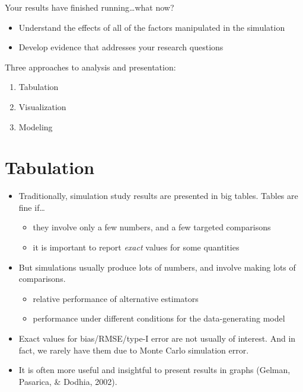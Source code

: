 \documentclass[
]{book}
\providecommand{\tightlist}{%
  \setlength{\itemsep}{0pt}\setlength{\parskip}{0pt}}
\begin{document}
Your results have finished running\ldots what now?

\begin{itemize}
\tightlist
\item
  Understand the effects of all of the factors manipulated in the simulation
\item
  Develop evidence that addresses your research questions
\end{itemize}

Three approaches to analysis and presentation:

\begin{enumerate}
\def\labelenumi{\arabic{enumi}.}
\tightlist
\item
  Tabulation
\item
  Visualization
\item
  Modeling
\end{enumerate}

\hypertarget{tabulation}{%
\section{Tabulation}\label{tabulation}}

\begin{itemize}
\item
  Traditionally, simulation study results are presented in big tables. Tables are fine if\ldots{}

  \begin{itemize}
  \tightlist
  \item
    they involve only a few numbers, and a few targeted comparisons
  \item
    it is important to report \emph{exact} values for some quantities
  \end{itemize}
\item
  But simulations usually produce lots of numbers, and involve making lots of comparisons.

  \begin{itemize}
  \tightlist
  \item
    relative performance of alternative estimators
  \item
    performance under different conditions for the data-generating model
  \end{itemize}
\item
  Exact values for bias/RMSE/type-I error are not usually of interest. And in fact, we rarely have them due to Monte Carlo simulation error.
\item
  It is often more useful and insightful to present results in graphs (Gelman, Pasarica, \& Dodhia, 2002).
\end{itemize}
\end{document}

